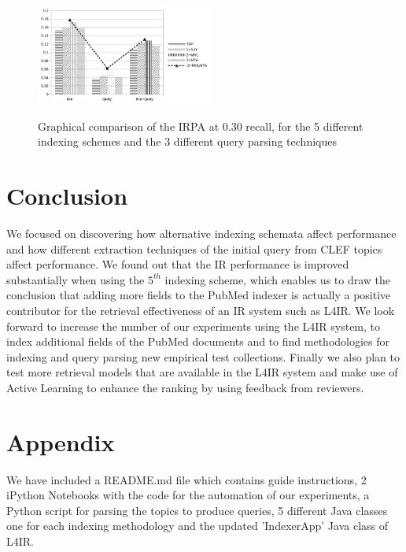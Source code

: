 \vspace{-0.3cm}
\begin{figure}[H]
    \centering 
  \includegraphics[height=4.05cm,width=0.520\textwidth]{interpolated_R_P_at_30.png}
  \vspace{-0.75cm}
    \caption{Graphical comparison of the IRPA at 0.30 recall, for the 5 different indexing schemes and the 3 different query parsing techniques}
    \label{fig:irp_at_30}
\end{figure}
\vspace{-0.6cm}
\section{Conclusion}

We focused on discovering how alternative indexing schemata affect performance and how different extraction techniques of the initial query from CLEF topics affect performance. We found out that the IR performance is improved substantially when using the $5^{th}$ indexing scheme, which enables us to draw the conclusion that adding more fields to the PubMed  indexer is actually a positive contributor for the retrieval  effectiveness of an IR system such as L4IR. We look forward to increase the number of our experiments using the L4IR system, to index additional fields of the PubMed documents and to find methodologies for indexing and query parsing new empirical test collections. Finally we also plan to test more retrieval models that are available in the L4IR system and make use of Active Learning to enhance the ranking by using feedback from reviewers. 


\appendix

\section{Appendix}
We have included a README.md file which contains guide instructions, 2 iPython Notebooks with the code for the automation of our experiments, a Python script for parsing the topics to produce queries, 5 different Java classes one for each indexing methodology and the updated 'IndexerApp' Java class of L4IR.

